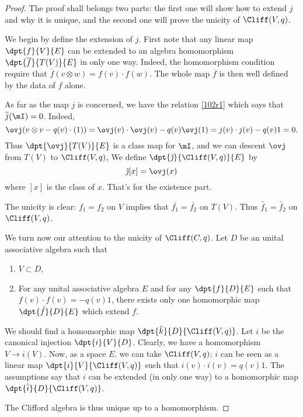 \begin{proof}
	The proof shall belongs two parts: the first one will show how to extend $j$ and why it is unique, and the second one will prove the unicity of $\Cliff(V,q)$.

	We begin by define the extension of $j$. First note that any linear map $\dpt{f}{V}{E}$ can be extended to an algebra homomorphism $\dpt{\overline{f}}{T(V)}{E}$ in only one way. Indeed, the homomorphism condition require that $\overline{f}(v\otimes w)=f(v)\cdot f(w)$.  The whole map $\overline{f}$ is then well defined by the data of $f$ alone.

	As far as the map $j$ is concerned, we have the relation \eqref{102r1} which says that $\overline{j}(\mI)=0$. Indeed,
	\begin{equation}
		\ovj(v\otimes v-q(v)\cdot(1))=\ovj(v)\cdot\ovj(v)-q(v)\ovj(1)
		=j(v)\cdot j(v)-q(v)1
		=0.
	\end{equation}
	Thus $\dpt{\ovj}{T(V)}{E}$ is a class map for $\mI$, and we can descent $\ovj$ from $T(V)$ to $\Cliff(V,q)$, We define
	$\dpt{\tilde\jmath}{\Cliff(V,q)}{E}$ by
	\begin{equation}
		\tilde\jmath[x]=\ovj(x)
	\end{equation}
	where $[x]$ is the class of $x$. That's for the existence part.

	The unicity is clear: $f_1=f_2$ on $V$ implies that $\overline{f_1}=\overline{f_2}$ on $T(V)$. Thus $\tilde{f_1}=\tilde{f_2}$ on $\Cliff(V,q)$.

	We turn now our attention to the unicity of $\Cliff(C,q)$. Let $D$ be an unital associative algebra such that
	\begin{enumerate}
		\item $V\subset D$,
		\item For any unital associative algebra $E$ and for any $\dpt{f}{D}{E}$ such that $f(v)\cdot f(v)=-q(v)1$, there exists only one homomorphic map $\dpt{\tilde{f}}{D}{E}$ which extend $f$.
	\end{enumerate}
	We should find a homomorphic map $\dpt{\tilde{k}}{D}{\Cliff(V,q)}$. Let $i$ be the canonical injection $\dpt{i}{V}{D}$. Clearly, we have a homomorphism $V\rightarrow i(V)$. Now, as a space $E$, we can take $\Cliff(V,q)$; $i$ can be seen as a linear map $\dpt{i}{V}{\Cliff(V,q)}$ such that $i(v)\cdot i(v)=q(v)1$. The assumptions say that $i$ can be extended (in only one way) to a homomorphic map $\dpt{\tilde{i}}{D}{\Cliff(V,q)}$.

	The Clifford algebra is thus unique up to a homomorphism.

\end{proof}


